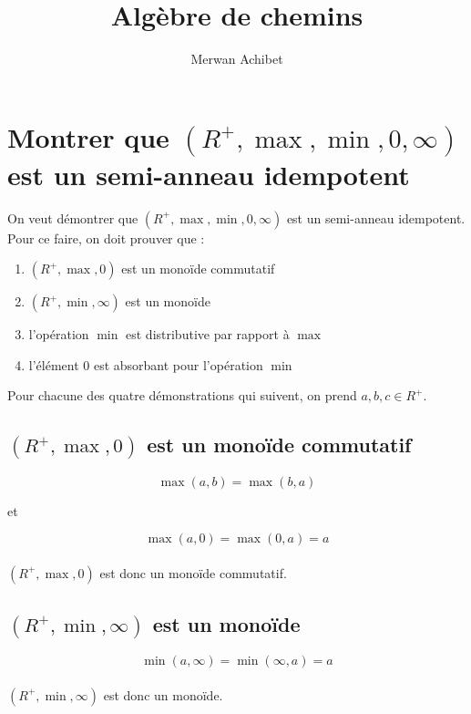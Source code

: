 \documentclass{article}
\title{Algèbre de chemins}
\author{Merwan Achibet}
\date{}
\begin{document}
\newcommand{\mmin}{\ensuremath{\operatorname{min}}}
\newcommand{\mmax}{\ensuremath{\operatorname{max}}}
\newcommand{\mMAX}{\ensuremath{\operatorname{MAX}}}

\maketitle

\section{Montrer que $(R^+, \mmax, \mmin, 0,
  \infty)$ est un semi-anneau idempotent}

On veut démontrer que $(R^+, \mmax, \mmin, 0, \infty)$ est un
semi-anneau idempotent. Pour ce faire, on doit prouver que :

\begin{enumerate}
  \item{$(R^+, \mmax, 0)$ est un monoïde commutatif}
  \item{$(R^+, \mmin, \infty)$ est un monoïde}
  \item{l'opération $\mmin$ est distributive par rapport à $\mmax$}
  \item{l'élément $0$ est absorbant pour l'opération $\mmin$}
\end{enumerate}

Pour chacune des quatre démonstrations qui suivent, on prend $a, b, c \in R^+$.

\subsection{$(R^+, \mmax, 0)$ est un monoïde commutatif}

$$ \mmax(a, b) = \mmax(b, a)$$
\begin{center}et\end{center}
$$ \mmax(a, 0) = \mmax(0, a) = a $$\\

$(R^+, \mmax, 0)$ est donc un monoïde commutatif.

\subsection{$(R^+, \mmin, \infty)$ est un monoïde}

$$ \mmin(a, \infty) = \mmin(\infty, a) = a$$\\

$(R^+, \mmin, \infty)$ est donc un monoïde.
\end{document}
